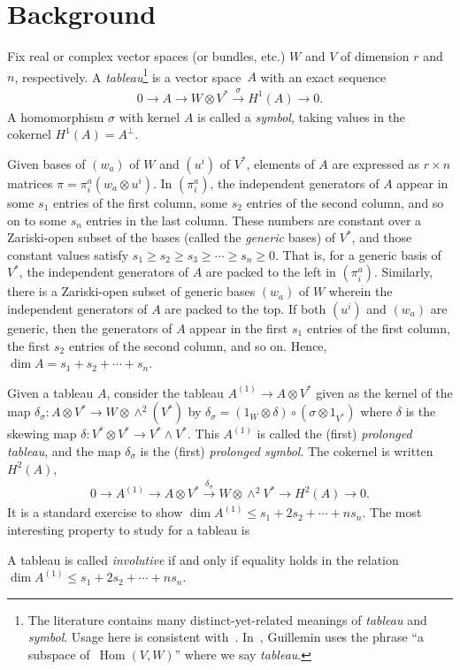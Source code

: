 \documentclass[11pt]{article}
\numberwithin{equation}{section}
\DeclareMathOperator{\Hom}{Hom}
\begin{document}
\section{Background}
Fix real or complex vector spaces (or bundles, etc.) $W$ and $V$ of dimension $r$ and $n$,
respectively. A
\textit{tableau}\footnote{The literature contains many
distinct-yet-related meanings of \emph{tableau} and \emph{symbol}.
Usage here is consistent with~\cite{BCGGG}.  In~\cite{Guillemin1968}, Guillemin
uses the phrase ``a subspace of~$\Hom(V,W)$'' where we say \emph{tableau}.}
is a vector space~$A$ with an exact sequence
\begin{gather*}
0 \longrightarrow A \longrightarrow W \otimes V^* \overset{\sigma}{\longrightarrow} H^{1}(A) \longrightarrow 0.
\label{spencer1}
\end{gather*}
A homomorphism $\sigma$ with kernel $A$ is called a \textit{symbol}, taking
values in the cokernel $H^{1}(A)=A^\perp$.

Given bases of $(w_a)$ of $W$ and $(u^i)$ of $V^*$, elements of $A$ are expressed as $r \times n$
matrices $\pi = \pi^a_i (w_a \otimes u^i)$.
In $(\pi^a_i)$, the independent generators of $A$ appear in some $s_1$ entries of the f\/irst
column, some $s_2$ entries of the second column, and so on to some $s_n$
entries in the last column.
These numbers are constant over a Zariski-open subset of the bases (called the
\textit{generic} bases) of $V^*$, and those constant values satisfy $s_1
\geq s_2 \geq s_3 \geq \cdots \geq s_n \geq 0$.  That is, for a generic basis
of $V^*$, the independent generators of $A$ are packed to the left in $(\pi^a_i)$.
Similarly, there is a Zariski-open subset of generic bases $(w_a)$ of $W$
wherein the independent
generators of $A$ are packed to the top.  If both $(u^i)$ and $(w_a)$ are
generic, then the generators of $A$ appear in the f\/irst $s_1$ entries of the
f\/irst column, the f\/irst $s_2$ entries of the second column, and so on.
Hence, $\dim A = s_1 + s_2 + \cdots + s_n$.

Given a tableau $A$, consider the tableau $A^{(1)} \to  A\otimes V^*$ given as the kernel of
the map $\delta_\sigma\colon A \otimes V^* \to W \otimes \wedge^2 (V^*)$ by
$\delta_\sigma = (1_W \otimes \delta)\circ(\sigma \otimes 1_{V^*})$ where $\delta$ is
the skewing map $\delta\colon V^* \otimes V^* \to V^* \wedge V^*$.
This $A^{(1)}$ is called the (f\/irst) \textit{prolonged tableau}, and the map
$\delta_\sigma$ is the (f\/irst) \textit{prolonged symbol}.  The cokernel is
written $H^{2}(A)$,
\begin{gather*}
0 \longrightarrow A^{(1)} \longrightarrow A \otimes V^* \overset{\delta_\sigma}{\longrightarrow} W \otimes
\wedge^2 V^* \longrightarrow H^2(A) \longrightarrow 0.
\label{spencer2}
\end{gather*}
It is a standard exercise to show
$\dim A^{(1)} \leq s_1 + 2s_2 + \cdots + n s_n$.
The most interesting property to study for a tableau is
\begin{Definition}[involutivity]
A tableau is called \emph{involutive} if and only if equality holds in the relation
$\dim A^{(1)} \leq s_1 + 2s_2 + \cdots + ns_n$.
\end{Definition}
\end{document}
